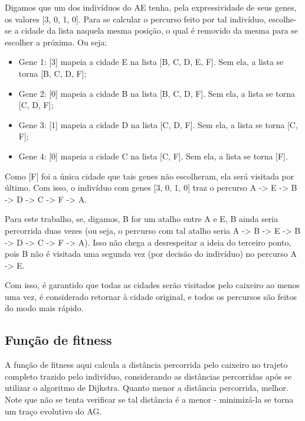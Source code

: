 Digamos que um dos indivíduos do AE tenha, pela expressividade de seus genes, os valores [3, 0, 1, 0]. Para se calcular o percurso feito por tal indivíduo, escolhe-se a cidade da lista naquela mesma posição, o qual é removido da mesma para se escolher a próxima. Ou seja:

\begin{itemize}
	\item Gene 1: [3] mapeia a cidade E na lista [B, C, D, E, F]. Sem ela, a lista se torna [B, C, D, F];
	\item Gene 2: [0] mapeia a cidade B na lista [B, C, D, F]. Sem ela, a lista se torna [C, D, F];
	\item Gene 3: [1] mapeia a cidade D na lista [C, D, F]. Sem ela, a lista se torna [C, F];
	\item Gene 4: [0] mapeia a cidade C na lista [C, F]. Sem ela, a lista se torna [F].
\end{itemize}

Como [F] foi a única cidade que tais genes não escolheram, ela será visitada por último. Com isso, o indivíduo com genes [3, 0, 1, 0] traz o percurso A -> E -> B -> D -> C -> F -> A.

Para este trabalho, se, digamos, B for um atalho entre A e E, B ainda seria percorrida duas vezes (ou seja, o percurso com tal atalho seria A -> B -> E -> B -> D -> C -> F -> A). Isso não chega a desrespeitar a ideia do terceiro ponto, pois B não é visitada uma segunda vez (por decisão do indivíduo) no percurso A -> E.

Com isso, é garantido que todas as cidades serão visitados pelo caixeiro ao menos uma vez, é considerado retornar à cidade original, e todos os percursos são feitos do modo mais rápido.

\subsection*{Função de fitness}

A função de fitness aqui calcula a distância percorrida pelo caixeiro no trajeto completo trazido pelo indivíduo, considerando as distâncias percorridas após se utilizar o algoritmo de Dijkstra. Quanto menor a distância percorrida, melhor. Note que não se tenta verificar se tal distância é a menor - minimizá-la se torna um traço evolutivo do AG.
